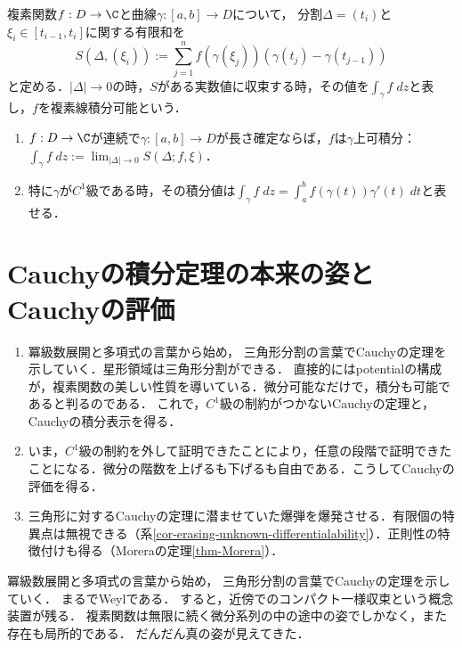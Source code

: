 \documentclass[uplatex, dvipdfmx]{jsreport}
\begin{document}
\begin{definition}
    複素関数$f:D\to\C$と曲線$\gamma:[a,b]\to D$について，
    分割$\Delta=(t_i)$と$\xi_i\in[t_{i-1},t_i]$に関する有限和を
    \[S(\Delta,(\xi_i)):=\sum^n_{j=1}f(\gamma(\xi_j))(\gamma(t_j)-\gamma(t_{j-1}))\]
    と定める．$|\Delta|\to 0$の時，$S$がある実数値に収束する時，その値を$\int_\gamma f\;dz$と表し，$f$を複素線積分可能という．
\end{definition}

\begin{shadebox}\begin{theorem}\mbox{}
    \begin{enumerate}
        \item $f:D\to\C$が連続で$\gamma:[a,b]\to D$が長さ確定ならば，$f$は$\gamma$上可積分：$\int_\gamma f\;dz:=\lim_{|\Delta|\to 0}S(\Delta;f,\xi)$．
        \item 特に$\gamma$が$C^1$級である時，その積分値は$\int_\gamma f\;dz=\int^b_af(\gamma(t))\gamma'(t)\;dt$と表せる．
    \end{enumerate}
\end{theorem}\end{shadebox}
\vspace{1mm}

\section{Cauchyの積分定理の本来の姿とCauchyの評価}

\begin{screen}
    \begin{enumerate}
        \item 冪級数展開と多項式の言葉から始め，
        三角形分割の言葉でCauchyの定理を示していく．星形領域は三角形分割ができる．
        直接的にはpotentialの構成が，複素関数の美しい性質を導いている．微分可能なだけで，積分も可能であると判るのである．
        これで，$C^1$級の制約がつかないCauchyの定理と，Cauchyの積分表示を得る．
        \item いま，$C^1$級の制約を外して証明できたことにより，任意の段階で証明できたことになる．微分の階数を上げるも下げるも自由である．こうしてCauchyの評価を得る．
        \item 三角形に対するCauchyの定理に潜ませていた爆弾を爆発させる．有限個の特異点は無視できる（系\ref{cor-erasing-unknown-differentialability}）．正則性の特徴付けも得る（Moreraの定理\ref{thm-Morera}）．
    \end{enumerate}
    冪級数展開と多項式の言葉から始め，
    三角形分割の言葉でCauchyの定理を示していく．
    まるでWeylである．
    すると，近傍でのコンパクト一様収束という概念装置が残る．
    複素関数は無限に続く微分系列の中の途中の姿でしかなく，また存在も局所的である．
    だんだん真の姿が見えてきた．
\end{screen}
\end{document}
